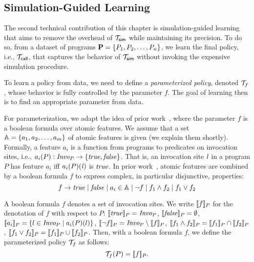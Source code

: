 
\subsection{Simulation-Guided Learning}\label{sec:learning}

The second technical contribution of this chapter is simulation-guided learning that aims to remove the overhead of $\mathcal{T}_{{\sf sim}}$ while maintaining its precision. 
To do so, from a dataset of programs $\mathbf{P} = \{ P_1, P_2, \dots, P_n \}$, 
we learn the final policy, i.e., $\mathcal{T}_{{\sf call}}$, that captures the behavior of
$\mathcal{T}_{{\sf sim}}$ without invoking the expensive simulation procedure. 


To learn a policy from data, we need to define a {\em parameterized
  policy}, denoted $\mathcal{T}_f$, whose behavior is
fully controlled by the parameter $f$. The goal of learning then
is to find an appropriate parameter from data.

For parameterization, we adapt the idea of prior work~\cite{JeJeChOh17},
where the parameter $f$ is a boolean formula over atomic features.
We assume that a set $\mathbb{A} = \{ a_1, a_2, \dots, a_m \}$ of atomic
features is given (we explain them shortly).  
Formally, a feature
$a_i$ is a function from programs to predicates on invocation sites, i.e.,
$a_i(P): \text{\it Invo}_P \to \{ {\it true}, {\it false} \}$.
That is, an invocation site ${\it l}$ in a program $P$ has feature
$a_i$ iff $a_i(P)({\it l})$ is ${\it true}$.
In prior work~\cite{JeJeOh18}, atomic features are combined by a
boolean formula $f$ to express complex, in particular disjunctive, 
properties: 
\[
f \to {\it true} \mid {\it false} \mid a_i \in \mathbb{A} \mid \neg f \mid f_1 \land
f_2 \mid f_1 \vee f_2
\]


A boolean formula $f$ denotes a set of
invocation sites. We write $[\![f]\!]_{P}$ for the denotation of $f$
with respect to $P$:  $[\![{\it true}]\!]_{P} = \text{\it Invo}_P$,
$[\![{\it false}]\!]_{P} = \emptyset$,
$[\![a_i]\!]_{P} = \{ l \in \text{\it Invo}_P \mid a_i(P)(l) \}$,
$[\![\neg f]\!]_{P} = \text{\it Invo}_P \setminus [\![f]\!]_{P}$,
$ [\![f_1 \land f_2]\!]_{P} = [\![f_1]\!]_{P} \cap
[\![f_2]\!]_{P}$,
$[\![f_1 \vee f_2]\!]_{P} = [\![f_1]\!]_{P} \cup
                                    [\![f_2]\!]_{P}$.
Then, with a boolean formula $f$, we define the parameterized policy
$\mathcal{T}_f$ as follows:
\[
\mathcal{T}_f(P) = [\![f]\!]_{P}.
\]



